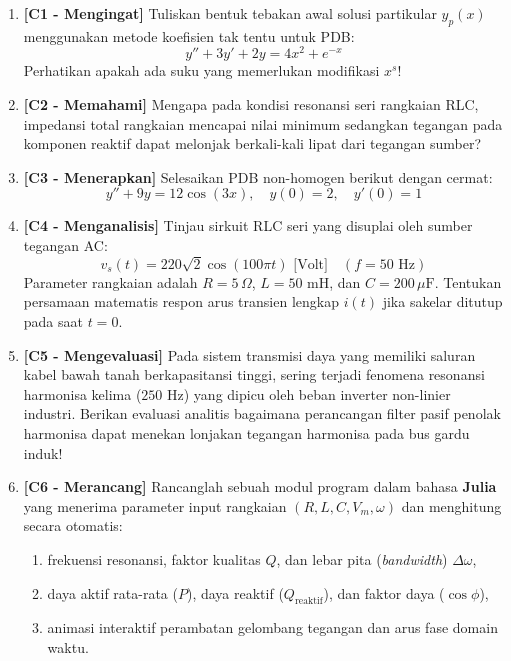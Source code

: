 \documentclass[11pt,a4paper]{article}
\theoremstyle{definition}
\begin{document}
\begin{enumerate}[leftmargin=*]
    \item \textbf{[C1 - Mengingat]} Tuliskan bentuk tebakan awal solusi partikular $y_p(x)$ menggunakan metode koefisien tak tentu untuk PDB:
    \begin{equation*}
        y'' + 3y' + 2y = 4x^2 + e^{-x}
    \end{equation*}
    Perhatikan apakah ada suku yang memerlukan modifikasi $x^s$!
    
    \item \textbf{[C2 - Memahami]} Mengapa pada kondisi resonansi seri rangkaian RLC, impedansi total rangkaian mencapai nilai minimum sedangkan tegangan pada komponen reaktif dapat melonjak berkali-kali lipat dari tegangan sumber?
    
    \item \textbf{[C3 - Menerapkan]} Selesaikan PDB non-homogen berikut dengan cermat:
    \begin{equation*}
        y'' + 9y = 12 \cos(3x), \quad y(0) = 2, \quad y'(0) = 1
    \end{equation*}
    
    \item \textbf{[C4 - Menganalisis]} Tinjau sirkuit RLC seri yang disuplai oleh sumber tegangan AC:
    \begin{equation*}
        v_s(t) = 220\sqrt{2} \cos(100\pi t)\text{ [Volt]} \quad (f = 50\text{ Hz})
    \end{equation*}
    Parameter rangkaian adalah $R = 5\,\Omega$, $L = 50\text{ mH}$, dan $C = 200\,\mu\text{F}$. Tentukan persamaan matematis respon arus transien lengkap $i(t)$ jika sakelar ditutup pada saat $t=0$.
    
    \item \textbf{[C5 - Mengevaluasi]} Pada sistem transmisi daya yang memiliki saluran kabel bawah tanah berkapasitansi tinggi, sering terjadi fenomena resonansi harmonisa kelima ($250\text{ Hz}$) yang dipicu oleh beban inverter non-linier industri. Berikan evaluasi analitis bagaimana perancangan filter pasif penolak harmonisa dapat menekan lonjakan tegangan harmonisa pada bus gardu induk!
    
    \item \textbf{[C6 - Merancang]} Rancanglah sebuah modul program dalam bahasa \textbf{Julia} yang menerima parameter input rangkaian $(R, L, C, V_m, \omega)$ dan menghitung secara otomatis:
    \begin{enumerate}[label=(\roman*)]
        \item frekuensi resonansi, faktor kualitas $Q$, dan lebar pita (\textit{bandwidth}) $\Delta \omega$,
        \item daya aktif rata-rata ($P$), daya reaktif ($Q_{\text{reaktif}}$), dan faktor daya ($\cos\phi$),
        \item animasi interaktif perambatan gelombang tegangan dan arus fase domain waktu.
    \end{enumerate}
\end{enumerate}
\end{document}
